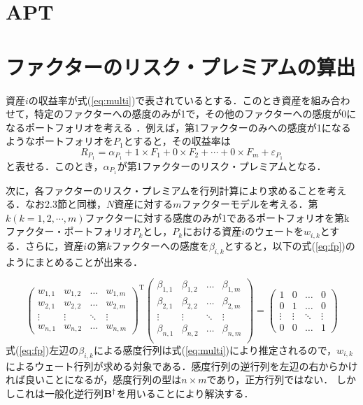 \documentclass[11pt]{jreport}
\begin{document}
\section{APT}
\section{ファクターのリスク・プレミアムの算出}
資産$i$の収益率が式(\ref{eq:multi})で表されているとする．このとき資産を組み合わせて，特定のファクターへの感度のみが1で，その他のファクターへの感度が0になるポートフォリオを考える ．例えば，第1ファクターのみへの感度が1になるようなポートフォリオを$P_1$とすると，その収益率は
\begin{equation}
R_{P_1} = \alpha_{P_1} + 1\times F_1 + 0\times F_2 + \cdots + 0\times F_m + \varepsilon_{P_1} 
\end{equation}
と表せる．このとき，$\alpha_{P_1}$が第1ファクターのリスク・プレミアムとなる．

次に，各ファクターのリスク・プレミアムを行列計算により求めることを考える．なお2.3節と同様，$N$資産に対する$m$ファクターモデルを考える．第$k(k=1,2,\cdots,m)$ファクターに対する感度のみが1であるポートフォリオを第kファクター・ポートフォリオ$P_k$とし，$P_k$における資産$i$のウェートを$w_{i,k}$とする．さらに，資産$i$の第$k$ファクターへの感度を$\beta_{i,k}$とすると，以下の式(\ref{eq:fp})のようにまとめることが出来る．

\begin{equation}
\left(
	\begin{array}{cccc}
	w_{1,1} & w_{1,2} & \ldots & w_{1,m}\\
	w_{2,1} & w_{2,2} & \ldots & w_{2,m}\\
	\vdots & \vdots & \ddots & \vdots\\
	w_{n,1} & w_{n,2} & \ldots & w_{n,m}
	\end{array}
\right)^{\mathrm{T}}
\left(
	\begin{array}{cccc}
	\beta_{1,1} & \beta_{1,2} & \ldots & \beta_{1,m}\\
	\beta_{2,1} & \beta_{2,2} & \ldots & \beta_{2,m}\\
	\vdots & \vdots & \ddots & \vdots\\
	\beta_{n,1} & \beta_{n,2} & \ldots & \beta_{n,m}\\
	\end{array}
\right)=
\left(
	\begin{array}{cccc}
	1 & 0 & \ldots & 0\\
	0 & 1 & \ldots & 0\\
	\vdots & \vdots & \ddots & \vdots \\
	0 & 0 & \ldots & 1
	\end{array}
\right)
\label{eq:fp}
\end{equation}
式(\ref{eq:fp})左辺の$\beta_{i,k}$による感度行列は式(\ref{eq:multi})により推定されるので，$w_{i,k}$によるウェート行列が求める対象である．感度行列の逆行列を左辺の右からかければ良いことになるが，感度行列の型は$n\times m$であり，正方行列ではない．
しかしこれは一般化逆行列$\bf{B}^\dag$を用いることにより解決する．
\end{document}
